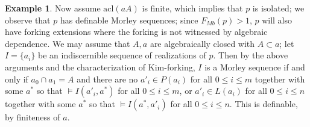 \documentclass[11pt]{amsart}
\theoremstyle{definition}
\newtheorem{example}[theorem]{Example}
\theoremstyle{remark}
\numberwithin{equation}{section}
\begin{document}
\begin{example}
Now assume $\mathrm{acl}(aA)$ is finite, which implies that $p$ is isolated; we observe that $p$ has definable Morley sequences; since $F_{Mb}(p) > 1$, $p$ will also have forking extensions where the forking is not witnessed by algebraic dependence. We may assume that $A, a$ are algebraically closed with $A \subset a$; let $I=\{a_{i}\}$ be an indiscernible sequence of realizations of $p$. Then by the above arguments and the characterization of Kim-forking, $I$ is a Morley sequence if and only if $a_{0} \cap a_{1} = A$ and there are no $a'_{i} \in P(a_{i})$ for all $0 \leq i \leq m$ together with some $a^{*}$ so that $\models I(a'_{i}, a^{*})$ for all $0 \leq i \leq m$, or $a'_{i} \in L(a_{i})$ for all $0 \leq i \leq n$ together with some $a^{*}$ so that $\models I(a^{*}, a'_{i})$ for all $0 \leq i \leq n$. This is definable, by finiteness of $a$.
        \end{example}
    
\end{document}
